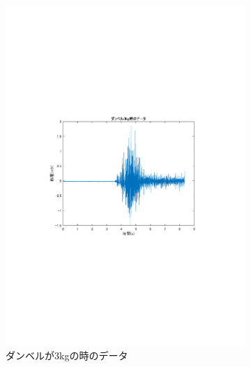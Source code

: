 \documentclass[dvipdfmx, titlepage, t]{jsarticle}
\begin{document}
\begin{figure}[H]
    \begin{subfigure}[b]{0.48\linewidth}
        \centering
        \includegraphics[trim=90 250 100 250 clip,width=\linewidth]{figure/data_3kg.pdf}
        \caption{ダンベルが3kgの時のデータ} %
        \label{fig:subc}
    \end{subfigure}
    \hfill
    \begin{subfigure}[b]{0.48\linewidth}
        \centering

\end{subfigure}
\end{figure}
\end{document}
